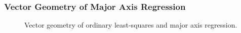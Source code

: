 \documentclass{beamer}
\begin{document}
\begin{frame}
  \frametitle{Vector Geometry of Major Axis Regression}

\begin{figure}
\begin{center}
\end{center}
\caption{Vector geometry of ordinary least-squares and major axis regression.}
\end{figure}


\end{frame}

\end{document}
